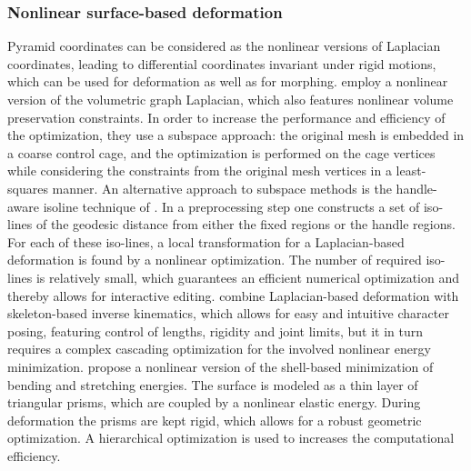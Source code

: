 \subsubsection{Nonlinear surface-based deformation}
Pyramid coordinates \citep{kraevoy2004cross,kraevoy2005template} can be considered as the nonlinear versions of Laplacian coordinates, leading to differential coordinates invariant under rigid motions, which can be used for deformation as well as for morphing. \cite{huang2006subspace} employ a nonlinear version of the volumetric graph Laplacian, which also features nonlinear volume preservation constraints. In order to increase the performance and efficiency of the optimization, they use a subspace approach: the original mesh is embedded in a coarse control cage, and the optimization is performed on the cage vertices while considering the constraints from the original mesh vertices in a least-squares manner. An alternative approach to subspace methods is the handle-aware isoline technique of \citep{au2007handle}. In a preprocessing step one constructs a set of iso-lines of the geodesic distance from either the fixed regions or the handle regions. For each of these iso-lines, a local transformation for a Laplacian-based deformation is found by a nonlinear optimization. The number of required iso-lines is relatively small, which guarantees an efficient numerical optimization and thereby allows for interactive editing. \cite{shi2007mesh} combine Laplacian-based deformation with skeleton-based inverse kinematics, which allows for easy and intuitive character posing, featuring control of lengths, rigidity and joint limits, but it in turn requires a complex cascading optimization for the involved nonlinear energy minimization. \cite{botsch2006primo} propose a nonlinear version of the shell-based minimization of bending and stretching energies. The surface is modeled as a thin layer of triangular prisms, which are coupled by a nonlinear elastic energy. During deformation the prisms are kept rigid, which allows for a robust geometric optimization. A hierarchical optimization is used to increases the computational efficiency.


